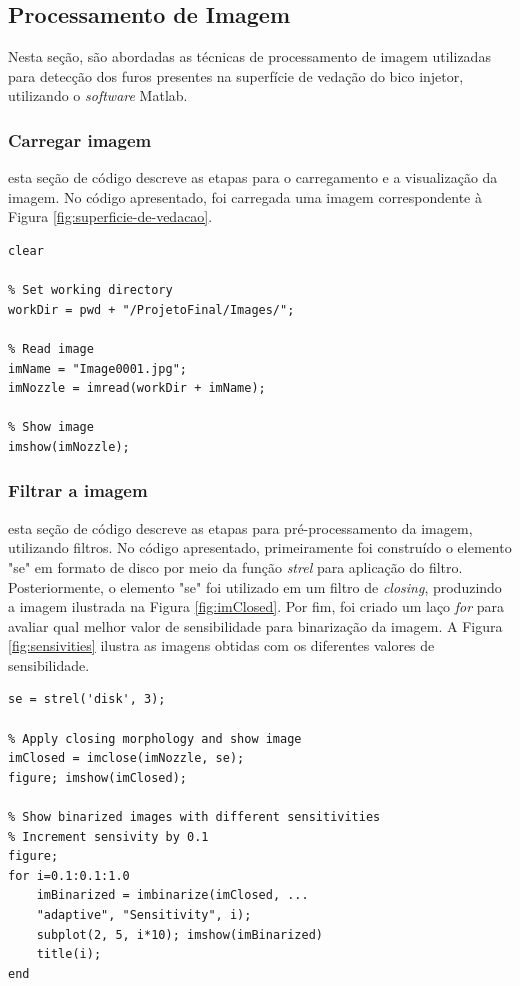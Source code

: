 \documentclass[conference]{IEEEtran}
\begin{document}
\subsection{Processamento de Imagem}

Nesta seção, são abordadas as técnicas de processamento de imagem utilizadas para detecção dos furos presentes na superfície de vedação do bico injetor, utilizando o \textit{software} Matlab.  

\subsubsection{Carregar imagem} esta seção de código descreve as etapas para o carregamento e a visualização da imagem. No código apresentado, foi carregada uma imagem correspondente à Figura \ref{fig:superficie-de-vedacao}. 

\begin{lstlisting}[caption={Carregar e visualizar a imagem}, label={lst:carregar-imagem}]
% Clear workspace
clear

% Set working directory
workDir = pwd + "/ProjetoFinal/Images/";

% Read image
imName = "Image0001.jpg";
imNozzle = imread(workDir + imName);

% Show image
imshow(imNozzle);
\end{lstlisting}

\subsubsection{Filtrar a imagem} esta seção de código descreve as etapas para pré-processamento da imagem, utilizando filtros. No código apresentado, primeiramente foi construído o elemento "se" em formato de disco por meio da função \textit{strel} para aplicação do filtro. Posteriormente, o elemento "se" foi utilizado em um filtro de \textit{closing}, produzindo a imagem ilustrada na Figura \ref{fig:imClosed}. Por fim, foi criado um laço \textit{for} para avaliar qual melhor valor de sensibilidade para binarização da imagem. A Figura \ref{fig:sensivities} ilustra as imagens obtidas com os diferentes valores de sensibilidade.

\begin{lstlisting}[caption={Filtrar a imagem e analisar sensibilidade para binarização}, label={lst:codigo}]
% Create structuring element
se = strel('disk', 3);

% Apply closing morphology and show image
imClosed = imclose(imNozzle, se);
figure; imshow(imClosed);

% Show binarized images with different sensitivities
% Increment sensivity by 0.1
figure;
for i=0.1:0.1:1.0
	imBinarized = imbinarize(imClosed, ...
	"adaptive", "Sensitivity", i); 
	subplot(2, 5, i*10); imshow(imBinarized)
	title(i);
end
\end{lstlisting}
\end{document}
